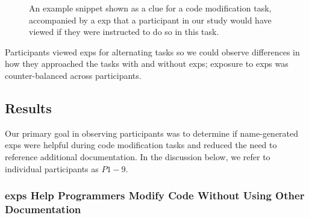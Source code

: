 \begin{figure}
\centering
{}
\caption{An example snippet shown as a clue for a code modification task, accompanied by a \gls{exp} that a participant in our study would have viewed if they were instructed to do so in this task.}
\label{fig:study_snippet}
\end{figure}

Participants viewed \glspl{exp} for alternating tasks so we could observe differences in how they approached the tasks with and without \glspl{exp}; exposure to \glspl{exp} was counter-balanced across participants. 


\subsection{Results}

Our primary goal in observing participants was to determine if \gls{name}-generated \glspl{exp} were helpful  during code modification tasks and reduced the need to reference additional documentation.
In the discussion below, we refer to individual participants as $P{1-9}$.

\subsubsection{\Glspl{exp} Help Programmers Modify Code Without Using Other Documentation}

